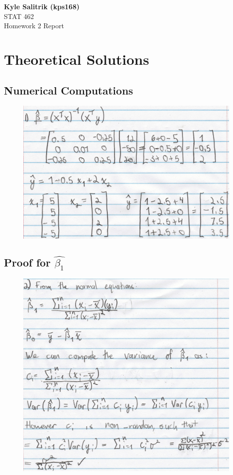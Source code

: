 \documentclass[a4paper, 11pt]{article}
\begin{document}
\graphicspath{{./figures/}}
\noindent
\large\textbf{Kyle Salitrik (kps168)} \\
\normalsize STAT 462\\
\large{Homework 2 Report} \hfill 



\section*{Theoretical Solutions}
\subsection*{Numerical Computations}
\begin{figure}[H]
	\centering
	\includegraphics[width=.6\textwidth]{p1.jpg}
\end{figure}
\subsection*{Proof for $\hat{\beta_1}$}
\begin{figure}[H]
	\centering
	\includegraphics[width=.6\textwidth]{p2-1.jpg}
\end{figure}
\end{document}

